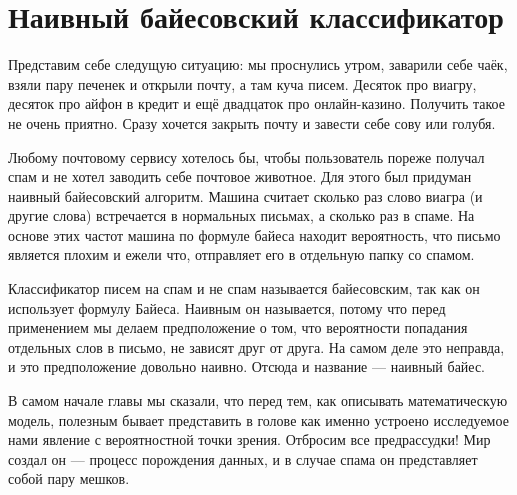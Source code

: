 \documentclass[12pt, a4paper, oneside]{extreport}
\theoremstyle{plain}              %
\theoremstyle{definition}         %
\begin{document}
\section{Наивный байесовский классификатор} 

Представим себе следущую ситуацию: мы проснулись утром, заварили себе чаёк, взяли пару печенек и открыли почту, а там куча писем.  Десяток про виагру, десяток про айфон в кредит и ещё двадцаток про онлайн-казино. Получить такое  не очень приятно. Сразу хочется закрыть почту и завести себе сову или голубя. 

Любому почтовому сервису хотелось бы, чтобы пользователь пореже получал спам и не хотел заводить себе почтовое животное.  Для этого был придуман наивный байесовский алгоритм. Машина считает сколько раз слово виагра (и другие слова) встречается в нормальных письмах, а сколько раз в спаме.  На основе этих частот машина по формуле байеса находит вероятность, что письмо является плохим и ежели что, отправляет его в отдельную папку со спамом. 

Классификатор писем на спам и не спам называется байесовским, так как он использует формулу Байеса. Наивным он называется, потому что перед применением мы делаем предположение о том, что вероятности попадания отдельных слов в письмо, не зависят друг от друга. На самом деле это неправда, и это предположение довольно наивно. Отсюда и название --- наивный байес. 

В самом начале главы мы сказали, что перед тем, как описывать математическую модель, полезным бывает представить в голове как именно устроено исследуемое нами явление с вероятностной точки зрения. Отбросим все предрассудки! Мир создал он --- процесс порождения данных, и в случае спама он представляет собой пару мешков. 

\begin{center}
\end{center}
\end{document}
